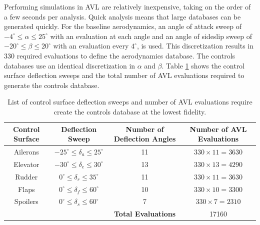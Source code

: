 Performing simulations in AVL are relatively inexpensive, taking on the order of a few seconds per analysis. 
Quick analysis means that large databases can be generated quickly. 
For the baseline aerodynamics, an angle of attack sweep of $-4 ^\circ \leq \alpha \leq 25 ^\circ$ with an evaluation at each angle and an angle of sideslip sweep of $-20 ^\circ \leq \beta \leq 20 ^\circ$ with an evaluation every $4^\circ$, is used. 
This discretization results in 330 required evaluations to define the aerodynamics database.
The controls databases use an identical discretization in $\alpha$ and $\beta$. 
Table \ref{tab:avl_data_points} shows the control surface deflection sweeps and the total number of AVL evaluations required to generate the controls database.

\begin{table}
    \renewcommand{\arraystretch}{1.2}
    \centering
    \begin{tabular}{ c|c|c|c } 
         Control Surface & Deflection Sweep & Number of Deflection Angles & Number of AVL Evaluations \\ 
         \hline
         Ailerons &  $-25^\circ \leq \delta_a \leq 25^\circ$ & 11 & $330 \times 11 = 3630$\\
         Elevator &  $-30^\circ \leq \delta_e \leq 30^\circ$ & 13 & $330 \times 13 = 4290$\\
         Rudder & $0^\circ \leq \delta_r \leq 35^\circ$ & 11 & $330 \times 11 = 3630$\\
         Flaps & $0^\circ \leq \delta_f \leq 60^\circ$ & 10 & $330 \times 10 = 3300$\\
         Spoilers & $0^\circ \leq \delta_s \leq 60^\circ$ & 7 & $330 \times 7 = 2310$\\
         \hline
         & & \textbf{Total Evaluations} & 17160
         
    \end{tabular}
    \caption{List of control surface deflection sweeps and number of AVL evaluations require create the controls database at the lowest fidelity.}
    \label{tab:avl_data_points}
\end{table}


